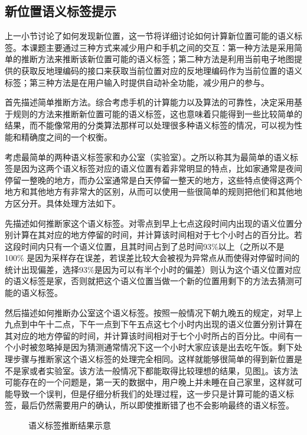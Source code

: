 \subsection{新位置语义标签提示}
上一小节讨论了如何发现新位置，这一节将详细讨论如何计算新位置可能的语义标签。本课题主要通过三种方式来减少用户和手机之间的交互：第一种方法是采用简单的推断方法来推断该新位置可能的语义标签；第二种方法是利用当前电子地图提供的获取反地理编码的接口来获取当前位置对应的反地理编码作为当前位置的语义标签；第三种方法是在用户输入时提供自动补全功能，减少用户的参与。
\par 首先描述简单推断方法。综合考虑手机的计算能力以及算法的可靠性，决定采用基于规则的方法来推断新位置可能的语义标签，这也意味着只能得到一些比较简单的结果，而不能像常用的分类算法那样可以处理很多种语义标签的情况，可以视为性能和精确度之间的一个权衡。
\par 考虑最简单的两种语义标签家和办公室（实验室）。之所以称其为最简单的语义标签是因为这两个语义标签对应的语义位置有着非常明显的特点，比如家通常是夜间停留一整晚的地方，而办公室通常是白天停留一整天的地方，这些特点使得这两个地方和其他地方有非常大的区别，从而可以使用一些很简单的规则把他们和其他地方区分开。具体处理方法如下。
\par 先描述如何推断家这个语义标签。对零点到早上七点这段时间内出现的语义位置分别计算在其对应的地方停留的时间，并计算该时间相对于七个小时占的百分比。若这段时间内只有一个语义位置，且其时间占到了总时间93\%以上（之所以不是100\% 是因为采样存在误差，若误差比较大会被视为异常点从而使得对停留时间的统计出现偏差，选择93\%是因为可以有半个小时的偏差）则认为这个语义位置对应的语义标签是家，否则就把这个语义位置当做一个新的位置用剩下的方法去猜测可能的语义标签。
\par 然后描述如何推断办公室这个语义标签。按照一般情况下朝九晚五的规定，对早上九点到中午十二点，下午一点到下午五点这七个小时内出现的语义位置分别计算在其对应的地方停留的时间，并计算该时间相对于七个小时所占的百分比。中间有一个小时被忽略掉是因为猜测通常情况下这一个小时大家应该是出去吃午饭。剩下处理步骤与推断家这个语义标签的处理完全相同。这样就能够很简单的得到新位置是不是家或者实验室。该方法一般情况下都能取得比较理想的结果，见图\ref{fig:3_14}。该方法可能存在的一个问题是，第一天的数据中，用户晚上并未睡在自己家里，这样就可能导致一个误判，但是仔细分析我们的处理过程，这一步只是计算可能的语义标签，最后仍然需要用户的确认，所以即使推断错了也不会影响最终的语义标签。
\begin{figure}[htb]
  \centering%
  \caption{语义标签推断结果示意}
  \label{fig:3_14}
\end{figure}
